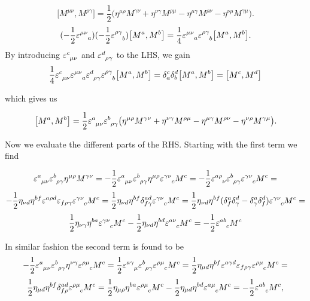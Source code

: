     $$
    \big[M^{\mu \nu}, M^{\rho \gamma} \big]=\frac{1}{2}\big(
    \eta^{\mu \rho} M^{\gamma \nu}+\eta^{\nu \gamma} M^{\rho \mu}-\eta^{\mu \gamma} M^{\rho \nu}-\eta^{\nu \rho} M^{\gamma \mu}\big).
    $$
    $$
    (-\frac{1}{2}\ep\ein{\mu \nu}{a})(-\frac{1}{2}\ep\ein{\rho \gamma}{b})\big[M^{a}, M^{b} \big]=\frac{1}{4}
    \ep\ein{\mu \nu}{a}
    \ep\ein{\rho \gamma}{b}
    \comb{M^{a}}{ M^{b}}.
    $$
    By introducing $\ep\ein{c}{\mu \nu}$ and $\ep\ein{d}{\rho \gamma}$ to the LHS, we gain
    $$    \frac{1}{4} \ep\ein{c}{\mu \nu}\ep\ein{\mu \nu}{a}
    \ep\ein{d}{\rho \gamma}\ep\ein{\rho \gamma}{b}\big[M^{a}, M^{b} \big]=
\de^c_a \de^d_b\big[M^{a}, M^{b} \big]=
   \big[M^{c}, M^{d} \big]
    $$

which gives us

\begin{equation}
    \big[M^{a}, M^{b} \big]=\frac{1}{2} \ep\ein{a}{\mu \nu} \ep\ein{b}{\rho \gamma}\big(\eta^{\mu \rho} M^{\gamma \nu}+\eta^{\nu \gamma} M^{\rho \mu}-\eta^{\mu \gamma} M^{\rho \nu}-\eta^{\nu \rho} M^{\gamma \mu} \big).
    \label{eq:parts}
\end{equation}


Now we evaluate the different parts of the RHS. Starting with the first term we find 


    $$
    \ep\ein{a}{\mu \nu} \ep\ein{b}{\rho \gamma}\eta^{\mu \rho} M^{\gamma \nu}
    =
-\frac{1}{2}\ep\ein{a}{\mu \nu} \ep\ein{b}{\rho\gamma}\eta^{\mu \rho} \ep \ein{\gamma \nu}{c }M^{c}=
-\frac{1}{2}\ep\ein{a \rho}{ \nu} \ep\ein{b}{\rho\gamma} \ep \ein{\gamma \nu}{c }M^{c}=
    $$
    $$
    -\frac{1}{2}\eta_{\nu d}\eta^{b f}\ep^{a \rho d} \ep_{f\rho\gamma} \ep \ein{\gamma \nu}{c }M^{c}=
    \frac{1}{2}\eta_{\nu
   d}\eta^{b f}\de^{ad}_{f \gamma} \ep \ein{\gamma \nu}{c}M^{c}=
    \frac{1}{2}\eta_{\nu d}\eta^{b f}(\de_f^a\de_\gamma^d-\de_\gamma^a\de_f^d)\ep\ein{\gamma\nu}{c}M^c=
    $$
    $$
    \frac{1}{2}\eta_{\nu \gamma}\eta^{b a}\ep\ein{\gamma\nu}{c}M^c
    -\frac{1}{2}\eta_{\nu d}\eta^{b d}\ep\ein{a\nu}{c}M^c=-\frac{1}{2}\ep\ein{ab}{c}M^c
    $$

In similar fashion the second term is found to be
    $$
-\frac{1}{2}\ep\ein{a}{\mu \nu}\ep\ein{b}{\rho\gamma}\eta^{\nu \gamma}\ep\ein{\rho\mu}{c} M^{c}=
\frac{1}{2}\ep\ein{a\gamma}{\mu}\ep\ein{b}{\rho\gamma}\ep\ein{\rho\mu}{c} M^{c}
=\frac{1}{2} 
\eta_{\mu d}\eta^{b f}
\ep^{a \gamma d} \ep_{f \rho \gamma}\ep\ein{\rho\mu}{c} M^{c}=
$$$$
\frac{1}{2}\eta_{\mu d}\eta^{b f}\de_{f\rho}^{ad}\ep\ein{\rho\mu}{c} M^{c}=
\frac{1}{2}\eta_{\mu\rho}\eta^{ba}\ep\ein{\rho\mu}{c}M^c
-\frac{1}{2}\eta_{\mu d}\eta^{b d}\ep\ein{a\mu}{c}M^c
=-\frac{1}{2}\ep\ein{ab}{c}M^c,
$$
    
